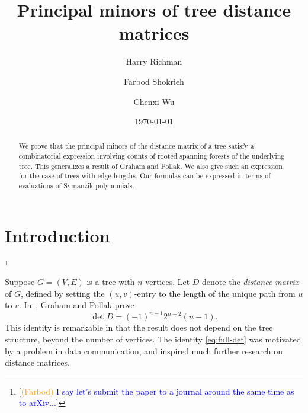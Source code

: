 \documentclass[12pt]{amsart}
\theoremstyle{definition}
\newcommand\farbod[1]{\footnote{[\textcolor{orange}{(Farbod)} \textcolor{blue}{#1}]}}
\begin{document}
\title{Principal minors of tree distance matrices}
\author{Harry Richman}
\author{Farbod Shokrieh}
\author{Chenxi Wu}
\date{\today}



\begin{abstract}
We prove that the principal minors of the distance matrix of a tree satisfy a combinatorial expression 
involving counts of rooted spanning forests of the underlying tree.
This generalizes a result of Graham and Pollak.
We also give such an expression for the case of trees with edge lengths.
Our formulas can be expressed in terms of evaluations of Symanzik polynomials.
\end{abstract}
\maketitle

\setcounter{tocdepth}{1}
\tableofcontents

\section{Introduction}
\farbod{I say let's submit the paper to a journal around the same time as to arXiv...}
\renewcommand*{\thethm}{\Alph{thm}}

Suppose $G = (V,E)$ is a tree with $n$ vertices.
Let $D$ denote the {\em distance matrix} of $G$, defined by setting the $(u,v)$-entry to the length of the unique path from $u$ to $v$.
In~\cite{graham-pollak}, Graham and Pollak prove
\begin{equation}\label{eq:full-det}
	\det D = (-1)^{n-1} 2^{n-2} (n-1). 
\end{equation}
This identity is remarkable in that the result does not depend on the tree structure,
beyond the number of vertices.
The identity \eqref{eq:full-det} was motivated by a problem in data communication,
and inspired much further research on distance matrices.
\end{document}
